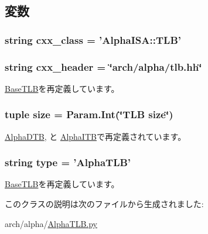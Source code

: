 \subsection{変数}
\hypertarget{classAlphaTLB_1_1AlphaTLB_a58cd55cd4023648e138237cfc0822ae3}{
\subsubsection[{cxx\_\-class}]{\setlength{\rightskip}{0pt plus 5cm}string {\bf cxx\_\-class} = '{\bf AlphaISA::TLB}'}}
\label{classAlphaTLB_1_1AlphaTLB_a58cd55cd4023648e138237cfc0822ae3}
\hypertarget{classAlphaTLB_1_1AlphaTLB_a17da7064bc5c518791f0c891eff05fda}{
\subsubsection[{cxx\_\-header}]{\setlength{\rightskip}{0pt plus 5cm}string {\bf cxx\_\-header} = \char`\"{}arch/alpha/tlb.hh\char`\"{}}}
\label{classAlphaTLB_1_1AlphaTLB_a17da7064bc5c518791f0c891eff05fda}


\hyperlink{classBaseTLB_1_1BaseTLB_a17da7064bc5c518791f0c891eff05fda}{BaseTLB}を再定義しています。\hypertarget{classAlphaTLB_1_1AlphaTLB_a377e5da8df1f89c5468c8b8cd07eac89}{
\subsubsection[{size}]{\setlength{\rightskip}{0pt plus 5cm}tuple {\bf size} = Param.Int(\char`\"{}TLB {\bf size}\char`\"{})}}
\label{classAlphaTLB_1_1AlphaTLB_a377e5da8df1f89c5468c8b8cd07eac89}


\hyperlink{classAlphaTLB_1_1AlphaDTB_a439227feff9d7f55384e8780cfc2eb82}{AlphaDTB}, と \hyperlink{classAlphaTLB_1_1AlphaITB_a439227feff9d7f55384e8780cfc2eb82}{AlphaITB}で再定義されています。\hypertarget{classAlphaTLB_1_1AlphaTLB_acce15679d830831b0bbe8ebc2a60b2ca}{
\subsubsection[{type}]{\setlength{\rightskip}{0pt plus 5cm}string {\bf type} = '{\bf AlphaTLB}'}}
\label{classAlphaTLB_1_1AlphaTLB_acce15679d830831b0bbe8ebc2a60b2ca}


\hyperlink{classBaseTLB_1_1BaseTLB_acce15679d830831b0bbe8ebc2a60b2ca}{BaseTLB}を再定義しています。

このクラスの説明は次のファイルから生成されました:\begin{DoxyCompactItemize}
\item 
arch/alpha/\hyperlink{AlphaTLB_8py}{AlphaTLB.py}\end{DoxyCompactItemize}
